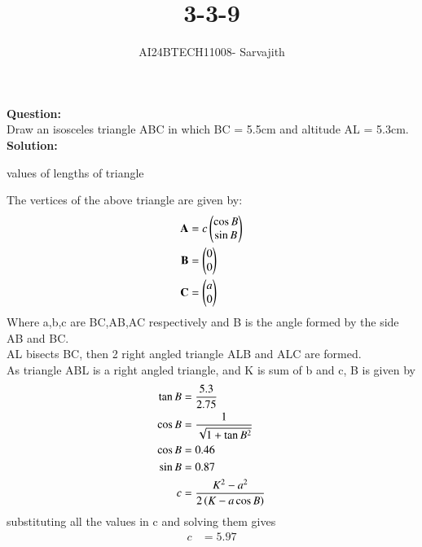 \documentclass[journal]{IEEEtran}
\begin{document}

\vspace{3cm}

\title{3-3-9}
\author{AI24BTECH11008- Sarvajith
}
{\let\newpage\relax\maketitle}

\renewcommand{\thefigure}{\theenumi}
\renewcommand{\thetable}{\theenumi}
\setlength{\intextsep}{10pt} %
\renewcommand{\thetable}{\theenumi}
\textbf{Question: }\\
Draw an isosceles triangle ABC in which BC = 5.5cm and altitude AL = 5.3cm. \\
\textbf{Solution: }\\
\renewcommand{\tablename}{TABLE 1}
\begin{table}[h!]    
\centering
 
\caption{values of lengths of triangle}
 \label{tab1-1.2-18-1}
\end{table}
The vertices of the above triangle are given by:
\begin{align}
    \textbf{A} &= c\begin{pmatrix}\cos B\\\sin B\end{pmatrix} \label{eq. 3-3-9.1}\\
    \textbf{B} &= \begin{pmatrix}0\\0\end{pmatrix}\label{eq. 3-3-9.2}\\
    \textbf{C} &= \begin{pmatrix}a\\0\end{pmatrix}\label{eq. 3-3-9.3}
\end{align}
Where a,b,c are BC,AB,AC respectively and B is the angle formed by the side AB and BC.\\
AL bisects BC, then 2 right angled triangle ALB and ALC are formed.\\
As triangle ABL is a right angled triangle, and K is sum of b and c, B is given by 
\begin{align*}
    \tan B &= \frac{5.3}{2.75}\\
    \cos B &= \frac{1}{\sqrt{1+\tan B^2}}\\
    \cos B &= 0.46\\\sin B &= 0.87\\
    c &= \frac{K^2 - a^2}{2\left(K - a\cos B\right)} 
\end{align*}
substituting all the values in c and solving them gives 
\begin{align}
    c &= 5.97
\end{align}
\end{document}
